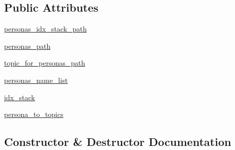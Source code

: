 \subsection*{Public Attributes}
\begin{DoxyCompactItemize}
\item 
\hyperlink{classparlai_1_1mturk_1_1tasks_1_1wizard__of__wikipedia_1_1worlds_1_1PersonasGenerator_a9c454a806475fb0b2eab6b6dac1b5296}{personas\+\_\+idx\+\_\+stack\+\_\+path}
\item 
\hyperlink{classparlai_1_1mturk_1_1tasks_1_1wizard__of__wikipedia_1_1worlds_1_1PersonasGenerator_a296d2c16e5eef15a27f6266316c2d775}{personas\+\_\+path}
\item 
\hyperlink{classparlai_1_1mturk_1_1tasks_1_1wizard__of__wikipedia_1_1worlds_1_1PersonasGenerator_a3e8ad4cab4e3e27bb7101981b7c62a65}{topic\+\_\+for\+\_\+personas\+\_\+path}
\item 
\hyperlink{classparlai_1_1mturk_1_1tasks_1_1wizard__of__wikipedia_1_1worlds_1_1PersonasGenerator_abf9a01dee416db70552558393aacc0cf}{personas\+\_\+name\+\_\+list}
\item 
\hyperlink{classparlai_1_1mturk_1_1tasks_1_1wizard__of__wikipedia_1_1worlds_1_1PersonasGenerator_a26ec8162aa90f3fa9a4e6e3d48bedc6e}{idx\+\_\+stack}
\item 
\hyperlink{classparlai_1_1mturk_1_1tasks_1_1wizard__of__wikipedia_1_1worlds_1_1PersonasGenerator_ad64661ce8580441c6facdf27a466605e}{persona\+\_\+to\+\_\+topics}
\end{DoxyCompactItemize}


\subsection{Constructor \& Destructor Documentation}
\mbox{\label{classparlai_1_1mturk_1_1tasks_1_1wizard__of__wikipedia_1_1worlds_1_1PersonasGenerator_a69ae53c0b17ddd4a5a2f4008382c4963}} 
